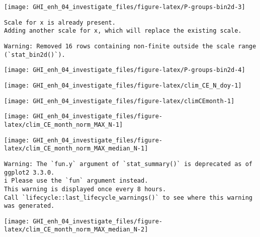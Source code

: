 \documentclass[
  10pt,
  a4paper,oneside]{article}
\begin{document}
\begin{center}\texttt{[image: GHI\_enh\_04\_investigate\_files/figure-latex/P-groups-bin2d-3]} \end{center}

\begin{verbatim}
Scale for x is already present.
Adding another scale for x, which will replace the existing scale.
\end{verbatim}

\begin{verbatim}
Warning: Removed 16 rows containing non-finite outside the scale range
(`stat_bin2d()`).
\end{verbatim}

\begin{center}\texttt{[image: GHI\_enh\_04\_investigate\_files/figure-latex/P-groups-bin2d-4]} \end{center}

\begin{center}\texttt{[image: GHI\_enh\_04\_investigate\_files/figure-latex/clim\_CE\_N\_doy-1]} \end{center}

\begin{center}\texttt{[image: GHI\_enh\_04\_investigate\_files/figure-latex/climCEmonth-1]} \end{center}

\begin{center}\texttt{[image: GHI\_enh\_04\_investigate\_files/figure-latex/clim\_CE\_month\_norm\_MAX\_N-1]} \end{center}

\begin{center}\texttt{[image: GHI\_enh\_04\_investigate\_files/figure-latex/clim\_CE\_month\_norm\_MAX\_median\_N-1]} \end{center}

\begin{verbatim}
Warning: The `fun.y` argument of `stat_summary()` is deprecated as of ggplot2 3.3.0.
i Please use the `fun` argument instead.
This warning is displayed once every 8 hours.
Call `lifecycle::last_lifecycle_warnings()` to see where this warning was generated.
\end{verbatim}

\begin{center}\texttt{[image: GHI\_enh\_04\_investigate\_files/figure-latex/clim\_CE\_month\_norm\_MAX\_median\_N-2]} \end{center}
\end{document}
